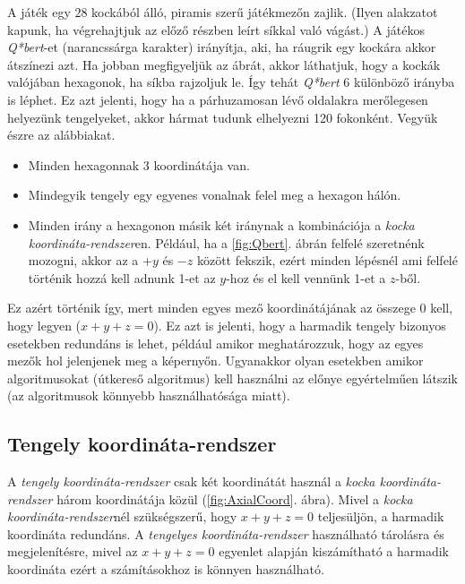 A játék egy $28$ kockából álló, piramis szerű játékmezőn zajlik. (Ilyen alakzatot kapunk, ha végrehajtjuk az előző részben leírt síkkal való vágást.) A játékos \textit{Q*bert}-et (narancssárga karakter) irányítja, aki, ha ráugrik egy kockára akkor átszínezi azt. Ha jobban megfigyeljük az ábrát, akkor láthatjuk, hogy a kockák valójában hexagonok, ha síkba rajzoljuk le. Így tehát \textit{Q*bert} 6 különböző irányba is léphet. Ez azt jelenti, hogy ha a párhuzamosan lévő oldalakra merőlegesen helyezünk tengelyeket, akkor hármat tudunk elhelyezni 120 fokonként. Vegyük észre az alábbiakat.
\begin{itemize}
\item Minden hexagonnak 3 koordinátája van. 
\item Mindegyik tengely egy egyenes vonalnak felel meg a hexagon hálón.
\item Minden irány a hexagonon másik két iránynak a kombinációja a \textit{kocka koordináta-rendszer}en. Például, ha a \ref{fig:Qbert}. ábrán felfelé szeretnénk mozogni, akkor az a $+y$ és $-z$ között fekszik, ezért minden lépésnél ami felfelé történik hozzá kell adnunk 1-et az $y$-hoz és el kell vennünk 1-et a $z$-ből. 
\end{itemize}
Ez azért történik így, mert minden egyes mező koordinátájának az összege $0$ kell, hogy legyen ($x + y + z = 0$). Ez azt is jelenti, hogy a harmadik tengely bizonyos esetekben redundáns is lehet, például amikor meghatározzuk, hogy az egyes mezők hol jelenjenek meg a képernyőn. Ugyanakkor olyan esetekben amikor algoritmusokat (útkereső algoritmus) kell használni az előnye egyértelműen látszik (az algoritmusok könnyebb használhatósága miatt). 

\subsection{Tengely koordináta-rendszer}
\cite{redblobgamesHexagonalGrids}

A \textit{tengely koordináta-rendszer} csak két koordinátát használ a \textit{kocka koordináta-rendszer} három koordinátája közül (\ref{fig:AxialCoord}. ábra). Mivel a \textit{kocka koordináta-rendszer}nél szükségszerű, hogy  $x + y + z = 0$ teljesüljön, a harmadik koordináta redundáns.  A \textit{tengelyes koordináta-rendszer} használható tárolásra és megjelenítésre, mivel az $x + y + z = 0$ egyenlet alapján kiszámítható a harmadik koordináta ezért a számításokhoz is könnyen használható.

